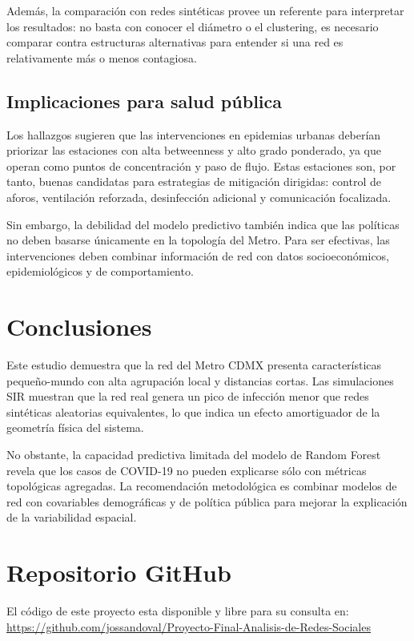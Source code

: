 \documentclass[10pt,twocolumn]{article}
\begin{document}
Además, la comparación con redes sintéticas provee un referente para interpretar los resultados: no basta con conocer el diámetro o el clustering, es necesario comparar contra estructuras alternativas para entender si una red es relativamente más o menos contagiosa.

\subsection{Implicaciones para salud pública}
Los hallazgos sugieren que las intervenciones en epidemias urbanas deberían priorizar las estaciones con alta betweenness y alto grado ponderado, ya que operan como puntos de concentración y paso de flujo. Estas estaciones son, por tanto, buenas candidatas para estrategias de mitigación dirigidas: control de aforos, ventilación reforzada, desinfección adicional y comunicación focalizada.

Sin embargo, la debilidad del modelo predictivo también indica que las políticas no deben basarse únicamente en la topología del Metro. Para ser efectivas, las intervenciones deben combinar información de red con datos socioeconómicos, epidemiológicos y de comportamiento.

\section{Conclusiones}
Este estudio demuestra que la red del Metro CDMX presenta características pequeño-mundo con alta agrupación local y distancias cortas. Las simulaciones SIR muestran que la red real genera un pico de infección menor que redes sintéticas aleatorias equivalentes, lo que indica un efecto amortiguador de la geometría física del sistema.

No obstante, la capacidad predictiva limitada del modelo de Random Forest revela que los casos de COVID-19 no pueden explicarse sólo con métricas topológicas agregadas. La recomendación metodológica es combinar modelos de red con covariables demográficas y de política pública para mejorar la explicación de la variabilidad espacial.

\section{Repositorio GitHub}

El código de este proyecto esta disponible y libre para su consulta en: \url{https://github.com/jossandoval/Proyecto-Final-Analisis-de-Redes-Sociales}
\end{document}
